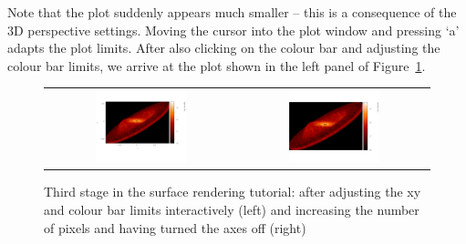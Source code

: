 \documentclass[a4paper,10pt]{article}
\begin{document}
Note that the plot suddenly appears much smaller -- this is a consequence of the 3D perspective settings. Moving the cursor into the plot window and pressing `a' adapts the plot limits. After also clicking on the colour bar and adjusting the colour bar limits, we arrive at the plot shown in the left panel of Figure~\ref{fig:surfpart3}.
\begin{figure}[h]
\begin{center}
\begin{tabular}{cc}
\includegraphics[width=0.5\textwidth]{surfpart5.png} &
\includegraphics[width=0.5\textwidth]{surfpart6.png}
\end{tabular}
\caption{Third stage in the surface rendering tutorial: after adjusting the xy and colour bar limits interactively (left) and increasing the number of pixels and having turned the axes off (right)}
\label{fig:surfpart3}
\end{center}
\end{figure}
\end{document}
